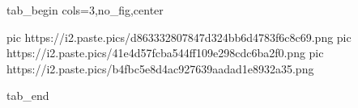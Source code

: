  
 
 
 
 


\ifcmt
  tab_begin cols=3,no_fig,center

     pic https://i2.paste.pics/d863332807847d324bb6d4783f6c8c69.png
		 pic https://i2.paste.pics/41e4d57fcba544ff109e298cdc6ba2f0.png
		 pic https://i2.paste.pics/b4fbc5e8d4ac927639aadad1e8932a35.png

  tab_end
\fi
